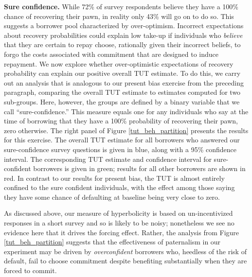 \documentclass[11pt, a4paper]{article}
\begin{document}
\vspace{.2in}
\noindent \textbf{Sure confidence.} While 72\% of survey respondents believe they have a 100\% chance of recovering their pawn, in reality only 43\% will go on to do so.  
This suggests a borrower pool characterized by over-optimism.
Incorrect expectations about recovery probabilities could explain low take-up if individuals who \emph{believe} that they are certain to repay choose, rationally given their incorrect beliefs, to forgo the costs associated with commitment that are designed to induce repayment. 
We now explore whether over-optimistic expectations of recovery probability can explain our positive overall TUT estimate.
To do this, we carry out an analysis that is analogous to our present bias exercise from the preceding paragraph, comparing the overall TUT estimate to estimates computed for two sub-groups.
Here, however, the groups are defined by a binary variable that we call ``sure-confidence.''
This measure equals one for any individuals who say at the time of borrowing that they have a 100\% probability of recovering their pawn, zero otherwise.
The right panel of Figure \ref{tut_beh_partition} presents the results for this exercise.
The overall TUT estimate for all borrowers who answered our sure-confidence survey questions is given in blue, along with a 95\% confidence interval.
The corresponding TUT estimate and confidence interval for sure-confident borrowers is given in green; results for all other borrowers are shown in red.
In contrast to our results for present bias, the TUT is almost entirely confined to the sure confident individuals, with the effect among those saying they have some chance of defaulting at baseline being very close to zero.  

As discussed above, our measure of hyperbolicity is based on un-incentivized responses in a short survey and so is likely to be noisy; nonetheless we see no evidence here that it drives the forcing effect.  Rather, the analysis from Figure \ref{tut_beh_partition} suggests that the effectiveness of paternalism in our experiment may be driven by \emph{overconfident} borrowers who, heedless of the risk of default, fail to choose commitment despite benefiting substantially when they are forced to commit. 

\end{document}

